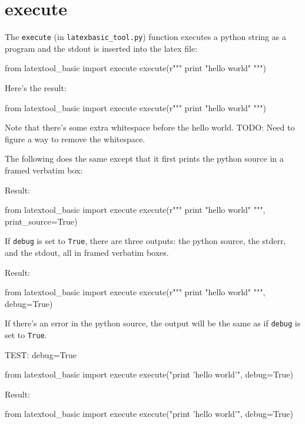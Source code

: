 \section{execute}
The \verb!execute! (in \verb!latexbasic_tool.py!) 
function executes a python string as a program
and the stdout is inserted into the latex file:
\begin{console}
\begin{python}
from latextool_basic import execute
execute(r"""
print "hello world"
""")
\end{python}
\end{console}
Here's the result:
\begin{python}
from latextool_basic import execute
execute(r"""
print "hello world"
""")
\end{python}

Note that there's some extra whitespace before the hello world.
TODO: Need to figure a way to remove the whitespace.

The following does the same except that it first prints
the python source in a framed verbatim box:
\begin{console}
Result:
\begin{python}
from latextool_basic import execute
execute(r"""
print "hello world"
""", print_source=True)
\end{python}
\end{console}

If \verb!debug! is set to \verb!True!, there are three
outputs: the python source, the stderr, and the stdout, all
in framed verbatim boxes.
\begin{console}
Result:
\begin{python}
from latextool_basic import execute
execute(r"""
print "hello world"
""", debug=True)
\end{python}
\end{console}
If there's an error in the python source, the output will be the same as if
\verb!debug! is set to \verb!True!.




TEST: debug=True
\begin{console}
from latextool_basic import execute
execute("print 'hello world'", debug=True)
\end{console}
Result:
\begin{python}
from latextool_basic import execute
execute("print 'hello world'", debug=True)
\end{python}






